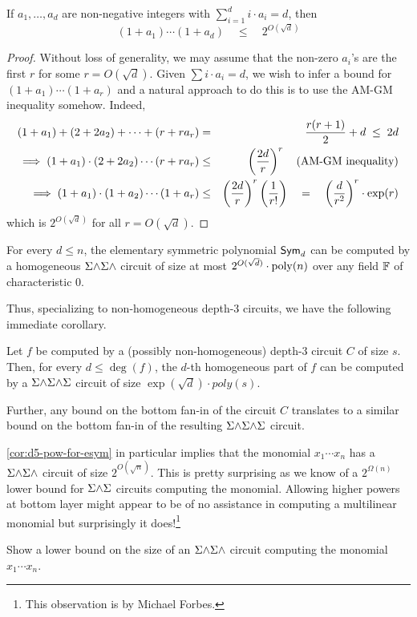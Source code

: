 \begin{proposition}\label{prop:sym-d5-am-gm}
If $a_1,\dots, a_d$ are non-negative integers with $\sum_{i=1}^d i \cdot a_i  = d$, then 
\[
(1+a_1)\cdots (1+a_d) \quad \leq \quad 2^{O(\sqrt{d})}
\]
\end{proposition}
\begin{proof}
  Without loss of generality, we may assume that the non-zero $a_i$'s
  are the first $r$ for some $r = O(\sqrt{d})$.
  Given $\sum i \cdot a_i = d$, we wish to infer a bound for
  $(1+a_1)\cdots (1+a_r)$ and a natural approach to do this is to use
  the AM-GM inequality somehow.
  Indeed,
  \begin{eqnarray*}
    (1 + a_1) + (2 + 2a_2) + \cdots + (r + r a_r) & = & \frac{r(r+1)}{2} + d \; \leq \;2d \\
    \implies    (1 + a_1) \cdot (2 + 2a_2) \cdots (r + r a_r) & \leq & \left(\frac{2d}{r}\right)^r \quad\text{(AM-GM inequality)}\\
    \implies    (1 + a_1) \cdot (1 + a_2) \cdots (1 + a_r) & \leq & \left(\frac{2d}{r}\right)^r \left(\frac{1}{r!}\right) \quad = \quad \left(\frac{d}{r^2}\right)^r \cdot \exp(r)
  \end{eqnarray*}
  which is $2^{O(\sqrt{d})}$ for all $r = O(\sqrt{d})$. 
\end{proof}

\begin{corollary}\label{cor:d5-pow-for-esym}
  For every $d \leq n$, the elementary symmetric polynomial $\operatorname{\mathsf{Sym}}_d$
  can be computed by a homogeneous $\Sigma\mathord{\wedge}\Sigma\mathord{\wedge}$ circuit of size at most
  $2^{O(\sqrt{d})} \cdot \operatorname{poly}(n)$ over any field $\mathbb{F}$ of
  characteristic $0$.
\end{corollary}

Thus, specializing to non-homogeneous depth-$3$ circuits, we have the
following immediate corollary. 

\begin{corollary}\label{cor:d5-pow-for-nonhom-d3}
  Let $f$ be computed by a (possibly non-homogeneous) depth-$3$
  circuit $C$ of size $s$.
  Then, for every $d \leq \deg(f)$, the $d$-th homogeneous part of $f$
  can be computed by a $\Sigma\mathord{\wedge}\Sigma\mathord{\wedge}\Sigma$ circuit of size $\exp(\sqrt{d}) \cdot
  poly(s)$.

  Further, any bound on the bottom fan-in of the circuit $C$
  translates to a similar bound on the bottom fan-in of the resulting
  $\Sigma\mathord{\wedge}\Sigma\mathord{\wedge}\Sigma$ circuit. 
\end{corollary}

\autoref{cor:d5-pow-for-esym} in particular implies that the monomial
$x_1\cdots x_n$ has a $\Sigma\mathord{\wedge}\Sigma\mathord{\wedge}$ circuit of size $2^{O(\sqrt{n})}$.
This is pretty surprising as we know of a $2^{\Omega(n)}$ lower bound
for $\Sigma\mathord{\wedge}\Sigma$ circuits computing the monomial.
Allowing higher powers at bottom layer might appear to be of no
assistance in computing a multilinear monomial but surprisingly it
does!\footnote{This observation is by Michael Forbes. }

\begin{openproblem}
Show a lower bound on the size of an $\Sigma\mathord{\wedge}\Sigma\mathord{\wedge}$ circuit computing the monomial $x_1\cdots x_n$. 
\end{openproblem}


